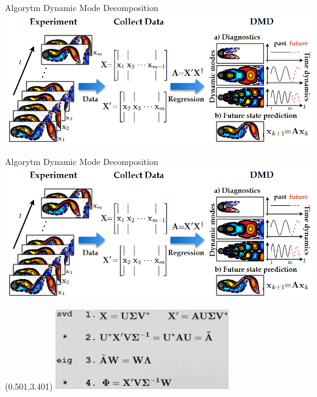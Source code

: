 \documentclass[aspectratio=169]{beamer}
\begin{document}
\begin{frame} {Algorytm Dynamic Mode Decomposition}
	\includegraphics[width=14cm]{imgs/dmd_img.png}
\end{frame}

\begin{frame} {Algorytm Dynamic Mode Decomposition}
	\includegraphics[width=14cm]{imgs/dmd_img.png}
\begin{textblock}{18}(0.501,3.401)
	\includegraphics[width=7.5cm]{imgs/dmd_alg_grey.png}
\end{textblock}
\end{frame}
\end{document}
